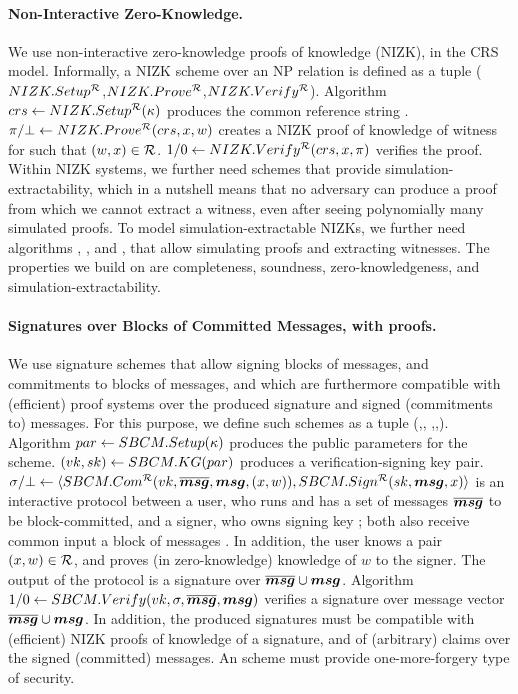 \paragraph{Non-Interactive Zero-Knowledge.} %
We use non-interactive zero-knowledge proofs of knowledge (NIZK), in the CRS
model. Informally, a NIZK scheme over an NP relation \NIZKRel is defined as a
tuple ($NIZK.Setup^{\mathcal{R}}$,$NIZK.Prove^{\mathcal{R}}$,$NIZK.Verify^\mathcal{R}$).
Algorithm $crs \gets NIZK.Setup^{\mathcal{R}}(\kappa)$ produces the common
reference string \NIZKcrs. $\pi/\bot \gets NIZK.Prove^{\mathcal{R}}(crs,
x,w)$ creates a NIZK proof of knowledge of witness \NIZKw for \NIZKx
such that $(w,x) \in \mathcal{R}$. $1/0 \gets NIZK.Verify^{\mathcal{R}}
(crs,x,\pi)$ verifies the proof. Within NIZK systems, we
further need schemes that provide simulation-extractability, which in a nutshell
means that no adversary can produce a proof from which we cannot extract a
witness, even after seeing polynomially many simulated proofs. To model
simulation-extractable NIZKs, we further need algorithms \NIZKSimSetup,
\NIZKSim, and \NIZKExtract, that allow simulating proofs and extracting
witnesses. The properties we build on are completeness, soundness,
zero-knowledgeness, and simulation-extractability.

\paragraph{Signatures over Blocks of Committed Messages, with proofs.} %
We use signature schemes that allow signing blocks of messages, and commitments
to blocks of messages, and which are furthermore compatible with (efficient)
proof systems over the produced signature and signed (commitments to) messages.
For this purpose, we define such schemes as a tuple (\SBCMSetup,\SBCMKeyGen,
\SBCMCom,\SBCMSign,\SBCMVerify). Algorithm $par \gets SBCM.Setup(\kappa)$
produces the public parameters for the scheme. %
$(vk,sk) \gets SBCM.KG(par)$ produces a verification-signing
key pair. $\sigma/\bot \gets\langle SBCM.Com^{\mathcal{R}}(vk,\overline{\boldsymbol{msg}},
\boldsymbol{msg},(x,w)),SBCM.Sign^\mathcal{R}(sk,\boldsymbol{msg},x) \rangle$ is an interactive protocol
between a user, who runs \SBCMCom and has a set of messages $\overline{\boldsymbol{msg}}$
to be block-committed, and a signer, who owns signing key \sk; both also receive
common input a block of messages \smsg. In addition, the user knows a pair
$(x,w) \in \mathcal{R}$, and proves (in zero-knowledge) knowledge of $w$ to the
signer. The output of the protocol is a signature over
$\overline{\boldsymbol{msg}} \cup \boldsymbol{msg}$. Algorithm $1/0 \gets SBCM.Verify(vk,
\sigma,\overline{\boldsymbol{msg}},\boldsymbol{msg})$ verifies a signature \sig over message vector
$\overline{\boldsymbol{msg}} \cup \boldsymbol{msg}$. In addition, the
produced signatures must be compatible with (efficient) NIZK proofs of knowledge
of a signature, and of (arbitrary) claims over the signed (committed) messages.
An \SBCM scheme must provide one-more-forgery type of security.

